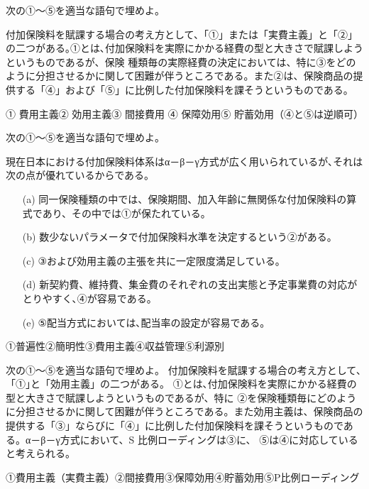 \documentclass[report,gutter=10mm,fore-edge=10mm,uplatex,dvipdfmx]{jlreq}
\begin{document}

次の①～⑤を適当な語句で埋めよ。

付加保険料を賦課する場合の考え方として、「①」または「実費主義」と「②」の二つがある｡①とは､付加保険料を実際にかかる経費の型と大きさで賦課しようというものであるが、保険
種類毎の実際経費の決定においては、特に③をどのように分担させるかに関して困難が伴うところである。また②は、保険商品の提供する「④」および「⑤」に比例した付加保険料を課そうというものである。


① 費用主義② 効用主義③ 間接費用
④ 保障効用⑤ 貯蓄効用（④と⑤は逆順可）


次の①～⑤を適当な語句で埋めよ。

現在日本における付加保険料体系はα－β－γ方式が広く用いられているが､それは次の点が優れているからである。

\begin{itemize}
 \item [(a)] 同一保険種類の中では、保険期間、加入年齢に無関係な付加保険料の算式であり、その中では①が保たれている。
 \item [(b)]数少ないパラメータで付加保険料水準を決定するという②がある。 
 \item [(c)]③および効用主義の主張を共に一定限度満足している。 
 \item [(d)]新契約費、維持費、集金費のそれぞれの支出実態と予定事業費の対応がとりやすく､④が容易である。
 \item [(e)]⑤配当方式においては､配当率の設定が容易である。
\end{itemize}


①普遍性②簡明性③費用主義④収益管理⑤利源別



次の①～⑤を適当な語句で埋めよ。
付加保険料を賦課する場合の考え方として､「①｣と「効用主義」の二つがある。
①とは､付加保険料を実際にかかる経費の型と大きさで賦課しようというものであるが、特に
②を保険種類毎にどのように分担させるかに関して困難が伴うところである。また効用主義は、保険商品の提供する「③」ならびに「④」に比例した付加保険料を課そうというものである。α－β－γ方式において、S
比例ローディングは③に、 ⑤は④に対応していると考えられる。


①費用主義（実費主義）②間接費用③保障効用④貯蓄効用⑤P比例ローディング

\end{document}
